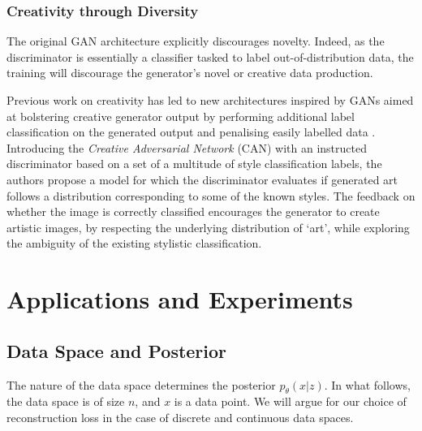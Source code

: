 \documentclass{article}
\begin{document}
\subsubsection{Creativity through Diversity}
\label{subsub:adver_crea}

The original GAN architecture explicitly discourages novelty.
Indeed, as the discriminator is essentially a classifier tasked to
label out-of-distribution data, the training will discourage the
generator's novel or creative data production.

Previous work on creativity has led to new architectures inspired by GANs aimed 
at bolstering creative generator output by performing additional label classification 
on the generated output and penalising easily labelled data \cite{elgammalCANCreativeAdversarial2017}.
Introducing the \emph{Creative Adversarial Network} (CAN) with an instructed discriminator based on a set of a multitude of style classification labels, the authors propose a model for which the discriminator evaluates if generated art follows a distribution corresponding to some of the known styles.
The feedback on whether the image is correctly classified
encourages the generator to create artistic images, by respecting the underlying distribution of `art', while exploring the ambiguity of the existing stylistic classification. 




\section{Applications and Experiments}
\label{sec:appl}

\subsection{Data Space and Posterior}
\label{subsec:vae_spaces}

The nature of the data space determines the posterior $p_\theta(x|z)$.
In what follows, the data space is of size $n$, and $x$ is a data point.
We will argue for our choice of reconstruction loss in the case
of discrete and continuous data spaces.
\end{document}

